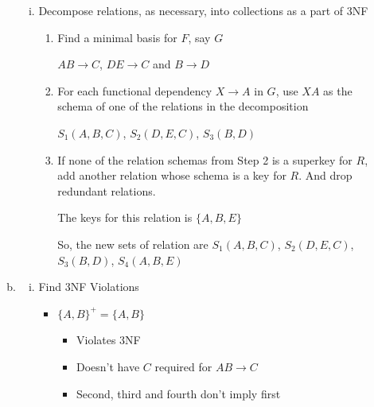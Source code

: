 \documentclass[12pt]{article}
\begin{document}
\begin{enumerate}[1.]
\begin{enumerate}[a)]
\begin{enumerate}[i)]
            \item Decompose relations, as necessary, into collections as a part of 3NF

            \bigskip

            \begin{enumerate}[1.]
                \item Find a minimal basis for $F$, say $G$

                \bigskip

                \color{red}
                $AB \to C$, $DE \to C$ and $B \to D$
                \color{black}

                \bigskip

                \item For each functional dependency $X \to A$ in $G$, use $XA$
                as the schema of one of the relations in the decomposition

                \bigskip

                \color{red}
                $S_1(A,B,C)$, $S_2(D,E,C)$, $S_3(B,D)$
                \color{black}

                \bigskip

                \item If none of the relation schemas from Step 2 is a superkey for $R$,
                add another relation whose schema is a key for $R$. And drop redundant relations.

                \bigskip

                \color{red}
                The keys for this relation is $\{A,B,E\}$

                \bigskip

                So, the new sets of relation are $S_1(A,B,C)$, $S_2(D,E,C)$, $S_3(B,D)$, $S_4(A,B,E)$
                \color{black}

                \bigskip

            \end{enumerate}
        \end{enumerate}

        \item

        \begin{enumerate}[i)]
            \item Find 3NF Violations

            \bigskip

            \color{red}
            \begin{itemize}
                \item $\{A,B\}^+ = \{A,B\}$
                \begin{itemize}
                    \item Violates 3NF
                    \item Doesn't have $C$ required for $AB \to C$
                    \item Second, third and fourth don't imply first
                \end{itemize}


\end{itemize}
\end{enumerate}
\end{enumerate}
\end{enumerate}
\end{document}
